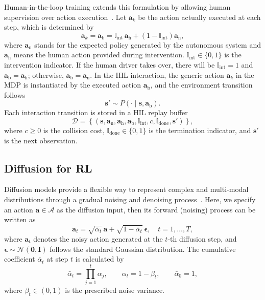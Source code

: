 \documentclass[9pt,journal]{IEEEtran}
\newcommand{\A}{\mathcal{A}}
\newcommand{\D}{\mathcal{D}}
\newcommand{\ind}{\mathbb{I}}
\newcommand{\va}{\bm{a}}
\newcommand{\vs}{\bm{s}}
\newcommand{\veps}{\bm{\epsilon}}
\newcommand{\vah}{\ensuremath{\va_{\mathrm h}}}      %
\newcommand{\van}{\ensuremath{\va_{\mathrm n}}}      %
\newcommand{\vab}{\ensuremath{\va_{\mathrm b}}}      %
\begin{document}
Human-in-the-loop training extends this formulation by allowing human supervision over action execution~\cite{peng2023pvp,li2025hdsac}. Let $\va_k$ be the action actually executed at each step, which is determined by
\begin{equation}
    \va_k
    =
    \vab
    =
    \ind_{\mathrm{int}}\,\vah
    +
    \left(1-\ind_{\mathrm{int}}\right)\van,
    \label{eq:blend}
\end{equation}
where $\van$ stands for the expected policy generated by the autonomous system and
$\vah$ means the human action provided during intervention. $\ind_{\mathrm{int}}\in\{0,1\}$ is the intervention indicator. If the human driver takes over, there will be $\ind_{\mathrm{int}} = 1$ and $\vab=\vah$; otherwise, 
$\vab=\van$. In the HIL interaction, the generic action $\va_k$ in the MDP is instantiated by the executed action $\vab$, and the environment transition follows
\begin{equation}
    \vs'\sim P\!\left(\cdot\mid\vs,\vab\right).
    \label{eq:hil_transition}
\end{equation}
Each interaction transition is stored in a HIL replay buffer
\begin{equation}
    \D=\left\{\left(
    \vs,\van,\vah,\vab,
    \ind_{\mathrm{int}},c,\ind_{\mathrm{done}},\vs'
    \right)\right\},
    \label{eq:buffer}
\end{equation}
where $c\geq0$ is the collision cost,
$\ind_{\mathrm{done}}\in\{0,1\}$ is the termination indicator, and
$\vs'$ is the next observation.


\subsection{Diffusion for RL}\label{sec:prelim_diff}

Diffusion models provide a flexible way to represent complex and
multi-modal distributions through a gradual noising and
denoising process~\cite{ho2020ddpm,chi2024diffusionpolicy,wang2024dacer}.
Here, we specify an action $\va \in \A$ as the diffusion input, then its
forward (noising) process can be written as
\begin{equation}
    \va_t=
    \sqrt{\bar\alpha_t}\,\va+
    \sqrt{1-\bar\alpha_t}\,\veps,
    \quad
    t=1,\ldots,T,
    \label{eq:forward}
\end{equation}
where $\va_t$ denotes the noisy action generated at the $t$-th diffusion
step, and $\veps\sim\mathcal N(\bm0,\bm I)$ follows the standard Gaussian
distribution. The cumulative coefficient $\bar\alpha_t$ at step $t$ is
calculated by
\begin{equation*}
    \bar\alpha_t=\prod_{j=1}^{t}\alpha_j,
    \qquad
    \alpha_t=1-\beta_t,
    \qquad
    \bar\alpha_0=1, 
\end{equation*}
where $\beta_t\in(0,1)$ is the prescribed noise variance.
\end{document}
